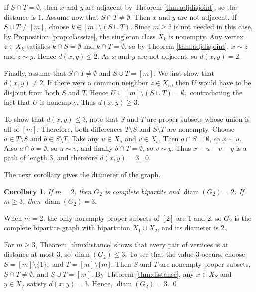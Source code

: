 \documentclass[12pt]{article}
\renewenvironment{proof}{{\bf \noindent Proof.}}{\qed}
\newtheorem{corollary}[theorem]{Corollary}
\theoremstyle{definition}
\begin{document}
	\begin{proof}
		If $S\cap T=\emptyset$, then $x$ and $y$ are adjacent by Theorem \ref{thm:adjdisjoint}, so the distance is $1$.
		 Assume now that $S\cap T\neq\emptyset$. Then $x$ and $y$ are not adjacent. If $S\cup T\neq [m]$, choose $k\in [m]\setminus (S\cup T)$. Since $m\geq 3$ is not needed in this case, by Proposition \ref{prop:classsize}, the singleton class $X_{{k}}$ is nonempty. Any vertex $z\in X_{{k}}$ satisfies ${k}\cap S=\emptyset$ and ${k}\cap T=\emptyset$, so by Theorem \ref{thm:adjdisjoint}, $x\sim z$ and $z\sim y$. Hence $d(x,y)\leq 2$. As $x$ and $y$ are not adjacent, so $d(x,y)=2$.
		
		Finally, assume that $S\cap T\neq\emptyset$ and $S\cup T=[m]$. We first show that $d(x,y)\neq 2$. If there were a common neighbor $z\in X_U$, then $U$ would have to be disjoint from both $S$ and $T$. Hence
		$ U\subseteq [m]\setminus (S\cup T)=\emptyset, $ contradicting the fact that $U$ is nonempty. Thus $d(x,y)\geq 3$.
		
		To show that $d(x,y)\leq 3$, note that $S$ and $T$ are proper subsets whose union is all of $[m]$. Therefore, both differences $T\setminus S$ and $S\setminus T$ are nonempty. Choose $a\in T\setminus S$ and $b\in S\setminus T$. Take any $u\in X_{{a}}$ and $v\in X_{{b}}$. Then ${a}\cap S=\emptyset$, so $x\sim u$. Also ${a}\cap{b}=\emptyset$, so $u\sim v$, and finally ${b}\cap T=\emptyset$, so $v\sim y$. Thus
		$ x-u-v-y $ is a path of length $3$, and therefore $d(x,y)=3$.
	\end{proof}
	
	\medskip
	The next corollary gives the diameter of the graph.	
	\begin{corollary}\label{cor:diameter}
		If $m=2$, then $G_2$ is complete bipartite and $\operatorname{diam}(G_2)=2$. If $m\geq 3$, then
		$ \operatorname{diam}(G_2)=3. $
	\end{corollary}
	
	\begin{proof}
		When $m=2$, the only nonempty proper subsets of $[2]$ are ${1}$ and ${2}$, so $G_2$ is the complete bipartite graph with bipartition $X_{{1}}\cup X_{{2}}$, and its diameter is $2$.
		
		For $m\geq 3$, Theorem \ref{thm:distance} shows that every pair of vertices is at distance at most $3$, so $\operatorname{diam}(G_2)\leq 3$. To see that the value $3$ occurs, choose
		$ S=[m]\setminus\{1\},$ and $ T=[m]\setminus\{m\}. $ Then $S$ and $T$ are nonempty proper subsets, $S\cap T\neq\emptyset$, and $S\cup T=[m]$. By Theorem \ref{thm:distance}, any $x\in X_S$ and $y\in X_T$ satisfy $d(x,y)=3$. Hence, $\operatorname{diam}(G_2)=3$.
	\end{proof}
	
\end{document}
